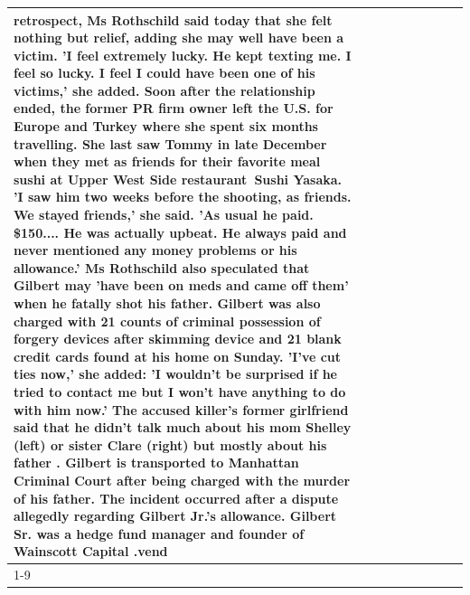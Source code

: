 \begin{table}[H]
\begin{tabular}{lllrlllll}
retrospect, Ms Rothschild said today that she felt nothing but relief, adding she may well have been a victim. 'I feel extremely lucky. He kept texting me. I feel so lucky. I feel I could have been one of his victims,' she added. Soon after the relationship ended, the former PR firm owner left the U.S. for Europe and Turkey where she spent six months  travelling. She last saw Tommy in late December when they met as friends for their favorite meal sushi at Upper West Side restaurant Sushi Yasaka. 'I saw him two weeks before the shooting, as friends. We stayed friends,' she said. 'As usual he paid. \$150.... He was actually upbeat. He always paid and never mentioned any money problems or his allowance.' Ms Rothschild also speculated that Gilbert may 'have been on meds and came off them' when he fatally shot his father. Gilbert was also charged with 21 counts of criminal possession of forgery devices after skimming device and 21 blank credit cards found at his home on Sunday. 'I've cut ties now,' she added: 'I wouldn’t be surprised if he tried to contact me but I won’t have anything to do with him now.' The accused killer's former girlfriend said that he didn't talk much about his mom Shelley (left) or sister Clare (right) but mostly about his father . Gilbert is transported to Manhattan Criminal Court  after being charged with the murder of his father. The incident occurred after a dispute allegedly regarding Gilbert Jr.'s allowance. Gilbert Sr. was a hedge fund manager and founder of Wainscott Capital .vend \\
\cline{1-9}

\end{tabular}
\end{table}
